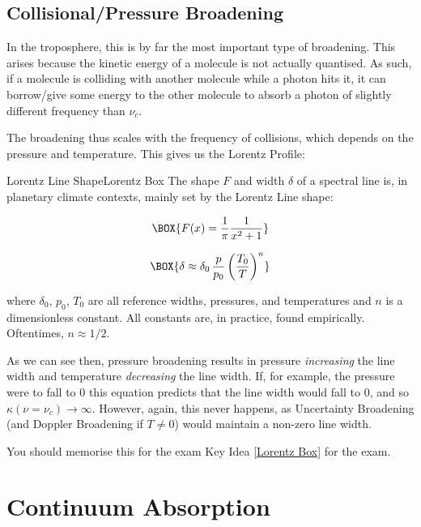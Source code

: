 \subsection{Collisional/Pressure Broadening}

In the troposphere, this is by far the most important type of broadening. This arises because the kinetic energy of a molecule is not actually quantised. As such, if a molecule is colliding with another molecule while a photon hits it, it can borrow/give some energy to the other molecule to absorb a photon of slightly different frequency than $\nu_c$.

The broadening thus scales with the frequency of collisions, which depends on the pressure and temperature. This gives us the Lorentz Profile:
\begin{fact}{Lorentz Line Shape}{Lorentz Box}\label{Lorentz Box}
    The shape $F$ and width $\delta$ of a spectral line is, in planetary climate contexts, mainly set by the Lorentz Line shape: 
    \begin{multicols}{2}
    \begin{align}
        \label{Lorenz F}
        \BOX{F(x)=\frac{1}{\pi}\frac{1}{x^2+1}}
    \end{align}

    \vspace{18 mm}
    \begin{align}
        \label{Lorenz width}
        \BOX{
            \delta \approx \delta_0\,\frac{p}{p_0}\left( \frac{T_0}{T} \right)^{n}
        }
    \end{align}
    \end{multicols}
    where $\delta_0$, $p_0$, $T_0$ are all reference widths, pressures, and temperatures and $n$ is a dimensionless constant. All constants are, in practice, found empirically. Oftentimes, $n\approx 1/2$.
\end{fact}
As we can see then, pressure broadening results in pressure \textit{increasing} the line width and temperature \textit{decreasing} the line width. If, for example, the pressure were to fall to $0$ this equation predicts that the line width would fall to $0$, and so $\kappa(\nu=\nu_c)\to\infty$. However, again, this never happens, as Uncertainty Broadening (and Doppler Broadening if $T\neq 0$) would maintain a non-zero line width.

You should memorise this for the exam Key Idea \ref{Lorentz Box} for the exam.

\section{Continuum Absorption}\label{Continuum}

